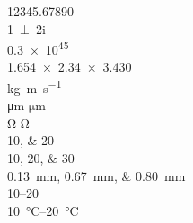 \documentclass[degree=doctor,fontset=fandol]{ustcthesis}
\begin{document}
\START
\showoutput

\noindent
\num{12345.67890} \\
\num{1+-2i} \\
\num{.3e45} \\
\num{1.654 x 2.34 x 3.430} \\
\si{kg.m.s^{-1}} \\
\si{\micro\meter} $\si{\micro\meter}$ \\
\si{\ohm} $\si{\ohm}$ \\
\numlist{10;20} \\
\numlist{10;20;30} \\
\SIlist{0.13;0.67;0.80}{\milli\metre} \\
\numrange{10}{20} \\
\SIrange{10}{20}{\degreeCelsius}

\clearpage
\end{document}
